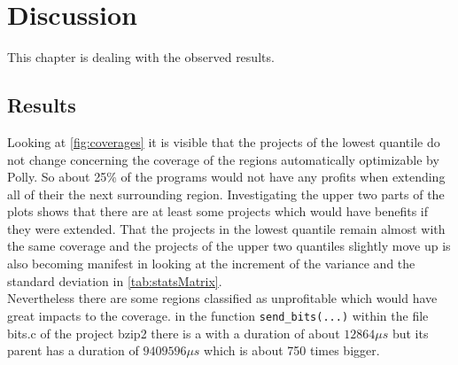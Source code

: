 \chapter{Discussion}
This chapter is dealing with the observed results.

\section{Results}
Looking at \autoref{fig:coverages} it is visible that the projects of the lowest quantile do not change concerning the coverage of the regions automatically optimizable by Polly.
So about 25\% of the programs would not have any profits when extending all of their \scops the next surrounding region.
Investigating the upper two parts of the plots shows that there are at least some projects which would have benefits if they were extended.
That the projects in the lowest quantile remain almost with the same coverage and the projects of the upper two quantiles slightly move up is also becoming manifest in looking at the increment of the variance and the standard deviation in \autoref{tab:statsMatrix}.\\
Nevertheless there are some regions classified as unprofitable which would have great impacts to the coverage.
\Eg in the function \texttt{send\_bits(...)} within the file bits.c of the project bzip2 there is a \scop with a duration of about \(12864 \mu s\) but its parent has a duration of \(9409596 \mu s\) which is about 750 times bigger.
